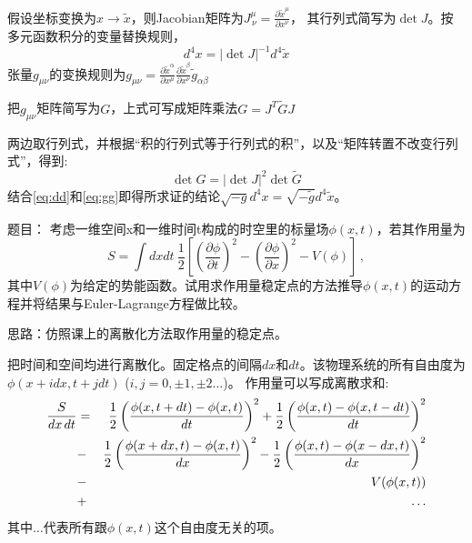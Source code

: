 \documentclass[CJK]{beamer}
\begin{document}
\begin{frame}
\bch
假设坐标变换为$x \rightarrow \tilde{x}$，则Jacobian矩阵为$J^\mu_{\,\nu} = \frac{\partial \tilde{x}^\mu}{\partial x^\nu}$， 其行列式简写为$\det{J}$。按多元函数积分的变量替换规则，
\begin{equation}
 d^4x = |\det{J}|^{-1} d^4\tilde{x} \label{eq:dd}
\end{equation}
张量$g_{\mu\nu}$的变换规则为$ g_{\mu\nu} =  \frac{\partial \tilde{x}^\alpha}{\partial x^\mu} \frac{\partial \tilde{x}^\beta}{\partial x^\nu} \tilde{g}_{\alpha\beta} $

把$g_{\mu\nu}$矩阵简写为$G$，上式可写成矩阵乘法$ G = J^T \tilde{G} J$

两边取行列式，并根据“积的行列式等于行列式的积”，以及“矩阵转置不改变行列式”，得到:
\begin{equation}
\det{G} = |\det{J}|^2 \det{\tilde{G}} \label{eq:gg}
\end{equation}
结合\eqref{eq:dd}和\eqref{eq:gg}即得所求证的结论$\sqrt{-g}d^4x = \sqrt{-\tilde{g}}d^4\tilde{x}$。

\ech
\end{frame}



\begin{frame}
\bch
题目： 考虑一维空间x和一维时间t构成的时空里的标量场$\phi(x,t)$，若其作用量为
$$ S = \int dx dt \   \frac{1}{2} \left[\left(\frac{\partial \phi}{\partial t}\right)^2 - \left(\frac{\partial \phi}{\partial x}\right)^2 - V(\phi)\right]\, ,$$
其中$V(\phi)$为给定的势能函数。试用求作用量稳定点的方法推导$\phi(x, t)$的运动方程并将结果与Euler-Lagrange方程做比较。

\skipline
思路：仿照课上的离散化方法取作用量的稳定点。
\ech
\end{frame}

\begin{frame}
\bch
把时间和空间均进行离散化。固定格点的间隔$dx$和$dt$。该物理系统的所有自由度为$\phi(x+idx, t+j dt)$ ($i, j = 0, \pm 1, \pm 2\ldots$)。
作用量可以写成离散求和:
\begin{eqnarray}
\frac{S}{dx\,dt} &=& \frac{1}{2}\left(\frac{\phi(x, t+dt) - \phi(x,t)}{dt}\right)^2 + \frac{1}{2}\left(\frac{\phi(x, t) - \phi(x,t-dt)}{dt}\right)^2 \nonumber \\
 &-&\frac{1}{2}\left(\frac{\phi(x+dx, t) - \phi(x,t)}{dx}\right)^2 - \frac{1}{2}\left(\frac{\phi(x, t) - \phi(x-dx,t)}{dx}\right)^2 \nonumber \\
 &-&V(\phi(x, t)) \nonumber \\
 &+&\ldots \nonumber
\end{eqnarray}
其中$\ldots$代表所有跟$\phi(x, t)$这个自由度无关的项。
\ech
\end{frame}
\end{document}
